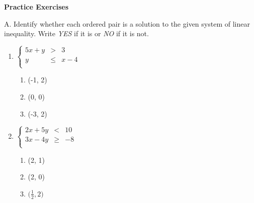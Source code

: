 \textbf{Practice Exercises}

\vspce

A. Identify whether each ordered pair is a solution to the given system of linear inequality. Write \emph{YES} if it is or \emph{NO} if it is not.
\begin{multicols}{2}
\begin{enumerate}[label = \arabic*. ]
\item $\left\{\begin{array}{rcl}
5x+y & > & 3 \\
y & \leq & x-4 \\
\end{array}\right.$
\begin{enumerate}[label = \alph*. ]
\item \hspce (-1, 2)
\item \hspce (0, 0)
\item \hspce (-3, 2) 
\end{enumerate}   

\vfill
\columnbreak

\item $\left\{\begin{array}{ccl}
2x+5y & < & 10 \\
3x-4y & \geq & -8 \\
\end{array}\right.$

\begin{enumerate}[label = \alph*. ]
\item \hspce (2, 1)
\item \hspce (2, 0)
\item \hspce $\big(\displaystyle \frac{1}{2}, 2\big)$
\end{enumerate}  

\end{enumerate}  
\end{multicols} 
